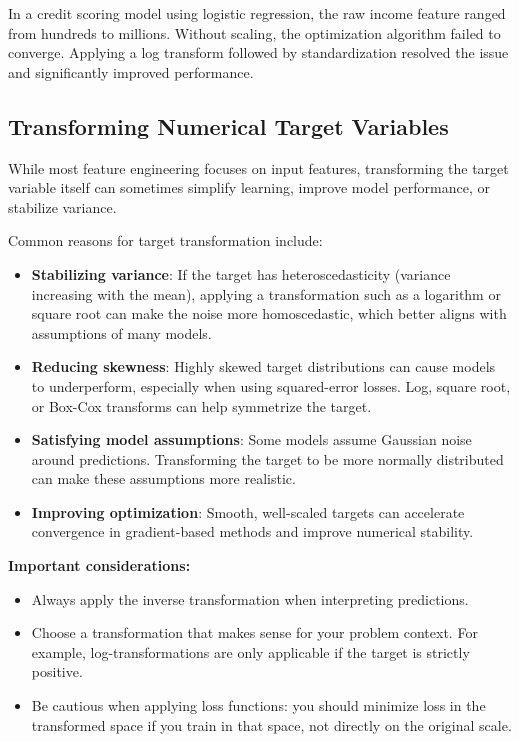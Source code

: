 \documentclass[12pt,openany]{book}
\begin{document}
\begin{examplebox}
In a credit scoring model using logistic regression, the raw income feature ranged from hundreds to millions. Without scaling, the optimization algorithm failed to converge. Applying a log transform followed by standardization resolved the issue and significantly improved performance. \mbox{}\\
\end{examplebox}


\subsection{Transforming Numerical Target Variables}

While most feature engineering focuses on input features, transforming the target variable itself can sometimes simplify learning, improve model performance, or stabilize variance.

Common reasons for target transformation include:
\begin{itemize}
    \item \textbf{Stabilizing variance}: If the target has heteroscedasticity (variance increasing with the mean), applying a transformation such as a logarithm or square root can make the noise more homoscedastic, which better aligns with assumptions of many models.
    \item \textbf{Reducing skewness}: Highly skewed target distributions can cause models to underperform, especially when using squared-error losses. Log, square root, or Box-Cox transforms can help symmetrize the target.
    \item \textbf{Satisfying model assumptions}: Some models assume Gaussian noise around predictions. Transforming the target to be more normally distributed can make these assumptions more realistic.
    \item \textbf{Improving optimization}: Smooth, well-scaled targets can accelerate convergence in gradient-based methods and improve numerical stability.
\end{itemize}

\textbf{Important considerations:}
\begin{itemize}
    \item Always apply the inverse transformation when interpreting predictions.
    \item Choose a transformation that makes sense for your problem context. For example, log-transformations are only applicable if the target is strictly positive.
    \item Be cautious when applying loss functions: you should minimize loss in the transformed space if you train in that space, not directly on the original scale.
\end{itemize}
\end{document}
